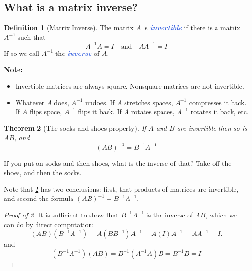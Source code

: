 \documentclass[10pt]{article}
\newcommand{\demph}[1]{\textcolor{RoyalBlue}{\textbf{\slshape #1}}} %
\newtheorem{theorem}{Theorem}
\theoremstyle{definition}
\newtheorem{definition}[theorem]{Definition}
\newcommand{\fl}[1]{\noindent\textbf{#1}}            %
\begin{document}
\subsection{What is a matrix inverse?}
\begin{definition}[Matrix Inverse]
  \label{def:matrix-inverse}  
  The matrix $A$ is \demph{invertible} if there is a matrix $A^{-1}$ such that
  \begin{equation*}
    A^{-1}A = I \quad \text{and} \quad AA^{-1}=I
  \end{equation*}
  If so we call $A^{-1}$ the \demph{inverse} of $A$.
\end{definition}

\fl{Note:}
\begin{itemize}
  \item Invertible matrices are always square. Nonsquare matrices are not
  invertible.
  
  \item Whatever $A$ does, $A^{-1}$ undoes. If $A$ stretches spaces, $A^{-1}$
  compresses it back. If $A$ flips space, $A^{-1}$ flips it back. If $A$
  rotates spaces, $A^{-1}$ rotates it back, etc.
\end{itemize}


\begin{theorem}[The socks and shoes property]
  \label{thm:socks-and-shoes-property}
  If $A$ and $B$ are invertible then so is $AB$, and
  \begin{equation*}
    (AB)^{-1} = B^{-1}A^{-1}
  \end{equation*}
\end{theorem}

If you put on socks and then shoes, what is the inverse of that? Take off the
shoes, and then the socks.

Note that \cref{thm:socks-and-shoes-property} has two conclusions: first, that
products of matrices are invertible, and second the formula
$(AB)^{-1}=B^{-1}A^{-1}$.

\begin{proof}[Proof of \cref{thm:socks-and-shoes-property}]
  It is sufficient to show that $B^{-1}A^{-1}$ is the inverse of $AB$, which
  we can do by direct computation:
  \begin{equation*}
    (AB)(B^{-1}A^{-1}) = A(BB^{-1})A^{-1} = A(I)A^{-1} = AA^{-1} = I.
  \end{equation*}
  and
  \begin{equation*}
    (B^{-1}A^{-1})(AB) = B^{-1}(A^{-1}A)B = B^{-1}B = I
  \end{equation*}
\end{proof}
\end{document}
